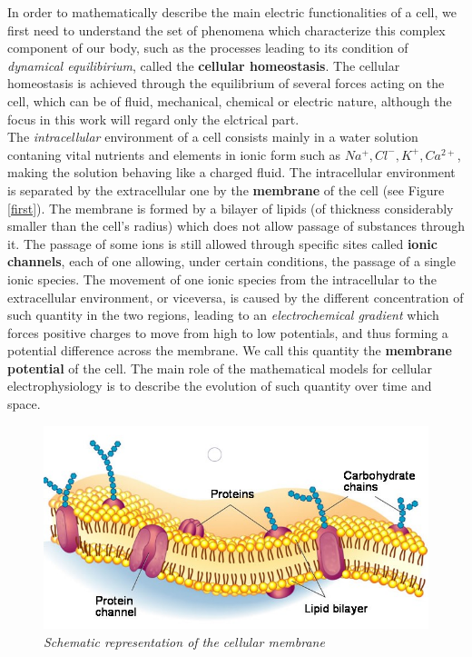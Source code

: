\documentclass[12pt, a4paper]{report}
\begin{document}
In order to mathematically describe the main electric functionalities of a cell, we first need to understand the set of phenomena which characterize this complex component of our body, such as the processes leading to its condition of \textit{dynamical equilibirium}, called the \textbf{cellular homeostasis}. The cellular homeostasis is achieved through the equilibrium of several forces acting on the cell, which can be of fluid, mechanical, chemical or electric nature, although the focus in this work will regard only the elctrical part.\\
The \textit{intracellular} environment of a cell consists mainly in a water solution contaning vital nutrients and elements in ionic form such as  $Na^+, Cl^-, K^+, Ca^{2+}$, making the solution behaving like a charged fluid. The intracellular environment is separated by the extracellular one by the \textbf{membrane} of the cell (see Figure \ref{first}). The membrane is formed by a bilayer of lipids (of thickness considerably smaller than the cell's radius) which does not allow passage of substances through it. The passage of some ions is still allowed through specific sites called \textbf{ionic channels}, each of one allowing, under certain conditions, the passage of a single ionic species. The movement of one ionic species from the intracellular to the extracellular environment, or viceversa, is caused by the different concentration of such quantity in the two regions, leading to an \textit{electrochemical gradient} which forces positive charges to move from high to low potentials, and thus forming a potential difference across the membrane. We call this quantity the \textbf{membrane potential} of the cell. The main role of the mathematical models for cellular electrophysiology is to describe the evolution of such quantity over time and space.
\\
\begin{figure}[H]
	
	
	\centering
	\includegraphics[scale=0.6]{membrane.jpg}
	
	
	
	\caption{\textit {Schematic representation of the cellular membrane}}
	
\end{figure}
\end{document}
